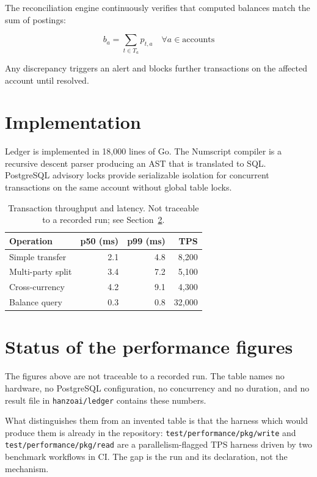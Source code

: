 \documentclass[11pt,twocolumn]{article}
\begin{document}
The reconciliation engine continuously verifies that computed balances match the sum of postings:

\begin{equation}
    b_a = \sum_{t \in T_a} p_{t,a} \quad \forall a \in \text{accounts}
\end{equation}

Any discrepancy triggers an alert and blocks further transactions on the affected account until resolved.

\section{Implementation}

Ledger is implemented in 18,000 lines of Go. The Numscript compiler is a recursive descent parser producing an AST that is translated to SQL. PostgreSQL advisory locks provide serializable isolation for concurrent transactions on the same account without global table locks.

\begin{table}[h]
\centering
\caption{Transaction throughput and latency. Not traceable to a recorded run; see Section~\ref{sec:figures}.}
\label{tab:ledger-perf}
\begin{tabular}{lrrr}
\toprule
\textbf{Operation} & \textbf{p50 (ms)} & \textbf{p99 (ms)} & \textbf{TPS} \\
\midrule
Simple transfer & 2.1 & 4.8 & 8,200 \\
Multi-party split & 3.4 & 7.2 & 5,100 \\
Cross-currency & 4.2 & 9.1 & 4,300 \\
Balance query & 0.3 & 0.8 & 32,000 \\
\bottomrule
\end{tabular}
\end{table}

\section{Status of the performance figures}
\label{sec:figures}

The figures above are not traceable to a recorded run. The table names no
hardware, no PostgreSQL configuration, no concurrency and no duration, and no
result file in \texttt{hanzoai/ledger} contains these numbers.

What distinguishes them from an invented table is that the harness which would
produce them is already in the repository: \texttt{test/performance/pkg/write}
and \texttt{test/performance/pkg/read} are a parallelism-flagged TPS harness
driven by two benchmark workflows in CI. The gap is the run and its
declaration, not the mechanism.
\end{document}

